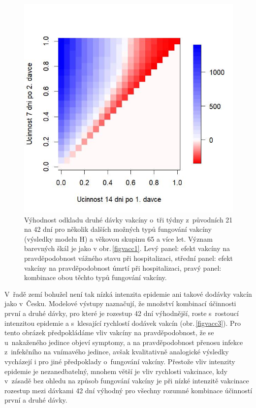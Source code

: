 \begin{figure}[ht!]
\begin{center}
\begin{minipage}[m]{0.3\linewidth}
		\end{minipage}
		\begin{minipage}[m]{0.3\linewidth}
			\includegraphics[width=\textwidth]{pic/JDL_DIFF_mean_T.jpg}
		\end{minipage}
	\end{center}
	\caption{Výhodnost odkladu druhé dávky vakcíny o~tři týdny z~původních 21 na 42 dní pro několik dalších možných typů fungování vakcíny (výsledky modelu H) a věkovou skupinu 65 a více let. Význam barevných škál je jako v obr.\,\ref{figvacc1}. Levý panel: efekt vakcíny na pravděpodobnost vážného stavu při hospitalizaci, střední panel: efekt vakcíny na pravděpodobnost úmrtí při hospitalizaci, pravý panel: kombinace obou těchto typů fungování vakcíny.}
	\label{figvacc2}
\end{figure}

V~řadě zemí bohužel není tak nízká intenzita epidemie ani takové dodávky vakcín jako v~Česku. Modelové výstupy naznačují, že množství kombinací účinnosti první a druhé dávky, pro které je rozestup 42 dní výhodnější, roste s~rostoucí intenzitou epidemie a s~klesající rychlostí dodávek vakcín (obr.\,\ref{figvacc3}). Pro tento obrázek předpokládáme vliv vakcíny na pravděpodobnost, že se u~nakaženého jedince objeví symptomy, a na pravděpodobnost přenosu infekce z~infekčního na vnímavého jedince, avšak kvalitativně analogické výsledky vycházejí i pro jiné předpoklady o~fungování vakcíny. Přestože vliv intenzity epidemie je nezanedbatelný, mnohem větší je vliv rychlosti vakcinace, kdy v~zásadě bez ohledu na způsob fungování vakcíny je při nízké intenzitě vakcinace rozestup mezi dávkami 42 dní výhodný pro všechny rozumné kombinace účinností první a druhé dávky.

